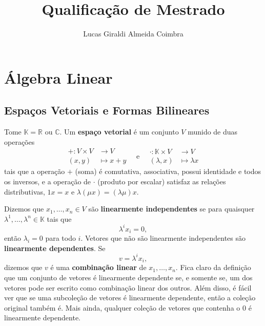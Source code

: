 \documentclass{article}
\title{Qualificação de Mestrado}
\author{Lucas Giraldi Almeida Coimbra}
\begin{document}
\maketitle
\tableofcontents

\section{Álgebra Linear}

\subsection{Espaços Vetoriais e Formas Bilineares}

Tome $\mathbb{K} = \mathbb{R}$ ou $\mathbb{C}$. Um \textbf{espaço vetorial} é um conjunto $V$ munido de duas operações \begin{equation}
    \begin{split}
        + \colon V \times V &\to V \\ (x,y) &\mapsto x + y
    \end{split} \quad \text{e} \quad \begin{split}
        \cdot \colon \mathbb{K} \times V &\to V \\ (\lambda,x) &\mapsto \lambda x
    \end{split}
\end{equation} tais que a operação $+$ (soma) é comutativa, associativa, possui identidade e todos os inversos, e a operação de $\cdot$ (produto por escalar) satisfaz as relações distributivas, $1x = x$ e $\lambda(\mu x) = (\lambda\mu)x$.

Dizemos que $x_1, \dots, x_n \in V$ são \textbf{linearmente independentes} se para quaisquer $\lambda^1, \dots, \lambda^n \in \mathbb{K}$ tais que \begin{equation}
    \lambda^i x_i = 0,
\end{equation} então $\lambda_i = 0$ para todo $i$. Vetores que não são linearmente independentes são \textbf{linearmente dependentes}. Se \begin{equation}
    v = \lambda^ix_i,
\end{equation} dizemos que $v$ é uma \textbf{combinação linear} de $x_1, \dots, x_n$. Fica claro da definição que um conjunto de vetores é linearmente dependente se, e somente se, um dos vetores pode ser escrito como combinação linear dos outros. Além disso, é fácil ver que se uma subcoleção de vetores é linearmente dependente, então a coleção original também é. Mais ainda, qualquer coleção de vetores que contenha o $0$ é linearmente dependente.
\end{document}
